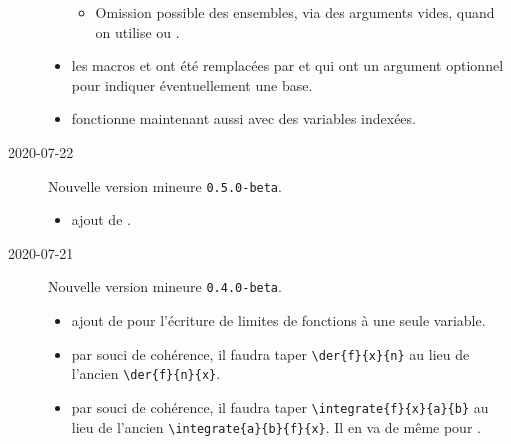 \documentclass[12pt,a4paper]{article}
\begin{document}
\begin{description}
\begin{itemize}[itemsep=.5em]
\begin{itemize}[itemsep=.5em]
            \item Omission possible des ensembles, via des arguments vides, quand on utilise  ou .
        \end{itemize}
    
    
        \item {}
              les macros  et  ont été remplacées par  et  qui ont un argument optionnel pour indiquer éventuellement une base.
    
    
        \item {}
               fonctionne maintenant aussi avec des variables indexées.
              
    \end{itemize}
    
    \separation

    \medskip
    \item[2020-07-22] Nouvelle version mineure \verb+0.5.0-beta+.
    
    \begin{itemize}[itemsep=.5em]
        \item {}
              ajout de .
    \end{itemize}
    
    \separation

    \medskip
    \item[2020-07-21] Nouvelle version mineure \verb+0.4.0-beta+.
    
    \begin{itemize}[itemsep=.5em]
        \item {}
              ajout de  pour l'écriture de limites de fonctions à une seule variable.
    
    
        \item {}
              par souci de cohérence, il faudra taper \verb#\der{f}{x}{n}# au lieu de l'ancien \verb#\der{f}{n}{x}#.
    
    
        \item {}
              par souci de cohérence, il faudra taper \verb#\integrate{f}{x}{a}{b}# au lieu de l'ancien \verb#\integrate{a}{b}{f}{x}#.
              Il en va de même pour .
    \end{itemize}
    

\end{description}
\end{document}
